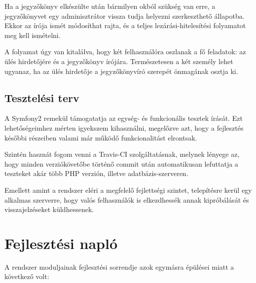 \documentclass[a4paper,12pt,oneside]{report}
\begin{document}
Ha a jegyzőkönyv elkészülte után bármilyen okból szükség van erre, a jegyzőkönyvet egy adminisztrátor vissza tudja helyezni szerkeszthető állapotba. Ekkor az írója ismét módosíthat rajta, és a teljes lezárási-hitelesítési folyamatot meg kell ismételni.

A folyamat úgy van kitalálva, hogy két felhasználóra oszlanak a fő feladatok: az ülés hirdetőjére és a jegyzőkönyv írójára. Természetesen a két személy lehet ugyanaz, ha az ülés hirdetője a jegyzőkönyvíró szerepét önmagának osztja ki.

\subsection{Tesztelési terv}

A Symfony2 remekül támogatatja az egység- és funkcionális tesztek írását. Ezt lehetőségeimhez mérten igyekszem kihasználni, megelőzve azt, hogy a fejlesztés későbbi részeiben valami már működő funkcionalitást elrontsak.

Szintén hasznát fogom venni a Travis-CI szolgáltatásnak, melynek lényege az, hogy minden verziókövetőbe történő commit után automatikusan lefuttatja a teszteket akár több PHP verzión, illetve adatbázis-szerveren.

Emellett amint a rendszer eléri a megfelelő fejlettségi szintet, telepítésre kerül egy alkalmas szerverre, hogy valós felhasználók is elkezdhessék annak kipróbálását és visszajelzéseket küldhessenek.

\section{Fejlesztési napló}

A rendszer moduljainak fejlesztési sorrendje azok egymásra épülései miatt a következő volt:
\end{document}
